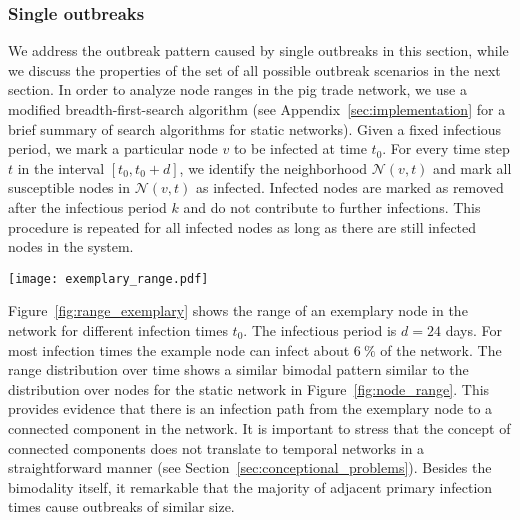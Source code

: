 \subsubsection{Single outbreaks}
We address the outbreak pattern caused by single outbreaks in this section, while we discuss the properties of the set of all possible outbreak scenarios in the next section.
In order to analyze node ranges in the pig trade network, we use a modified breadth-first-search algorithm (see Appendix~\ref{sec:implementation} for a brief summary of search algorithms for static networks).
Given a fixed infectious period, we mark a particular node $v$ to be infected at time $t_0$.
For every time step $t$ in the interval $[t_0,t_0+d]$, we identify the neighborhood $\mathcal{N}(v,t)$ and mark all susceptible nodes in $\mathcal{N}(v,t)$ as infected.
Infected nodes are marked as removed after the infectious period $k$ and do not contribute to further infections.
This procedure is repeated for all infected nodes as long as there are still infected nodes in the system.

\begin{SCfigure}
\texttt{[image: exemplary\_range.pdf]}
\caption{Temporal variation in the range $r(v,d,t_0)$ of an exemplary node $v$ in the network over one year.
Although the range remains rather constant for most infection times, it vanishes for certain periods.
The grey interval corresponds to the fixed infectious period $d=24$~days.
}
\label{fig:range_exemplary}
\end{SCfigure}
%
Figure~\ref{fig:range_exemplary} shows the range of an exemplary node in the network for different infection times $t_0$.
The infectious period is $d=24$ days.
For most infection times the example node can infect about $6~\%$ of the network.
The range distribution over time shows a similar bimodal pattern similar to the distribution over nodes for the static network in Figure~\ref{fig:node_range}.
This provides evidence that there is an infection path from the exemplary node to a connected component in the network.
It is important to stress that the concept of connected components does not translate to temporal networks in a straightforward manner (see Section~\ref{sec:conceptional_problems}).
Besides the bimodality itself, it remarkable that the majority of adjacent primary infection times cause outbreaks of similar size.

